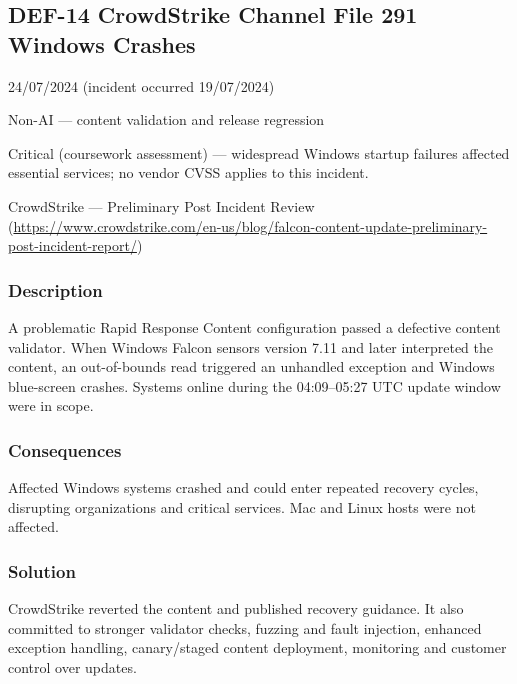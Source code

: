 \subsection{DEF-14 CrowdStrike Channel File 291 Windows Crashes}

\begin{description}[style=nextline,leftmargin=3.2cm]

\item[Publicized] 24/07/2024 (incident occurred 19/07/2024)

\item[Category] Non-AI — content validation and release regression

\item[Severity] Critical (coursework assessment) — widespread Windows startup failures affected essential services; no vendor CVSS applies to this incident.

\item[Source] CrowdStrike — Preliminary Post Incident Review (\url{https://www.crowdstrike.com/en-us/blog/falcon-content-update-preliminary-post-incident-report/})

\end{description}

\subsubsection{Description}

A problematic Rapid Response Content configuration passed a defective content validator. When Windows Falcon sensors version 7.11 and later interpreted the content, an out-of-bounds read triggered an unhandled exception and Windows blue-screen crashes. Systems online during the 04:09–05:27 UTC update window were in scope.

\subsubsection{Consequences}

Affected Windows systems crashed and could enter repeated recovery cycles, disrupting organizations and critical services. Mac and Linux hosts were not affected.

\subsubsection{Solution}

CrowdStrike reverted the content and published recovery guidance. It also committed to stronger validator checks, fuzzing and fault injection, enhanced exception handling, canary/staged content deployment, monitoring and customer control over updates.

